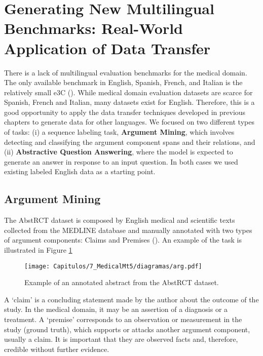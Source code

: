 \section[Generating New Multilingual Benchmarks]{Generating New Multilingual Benchmarks: Real-World Application of Data Transfer}\label{sec7:new-benchmarks}


There is a lack of multilingual evaluation benchmarks for the medical domain. The only available benchmark in English, Spanish, French, and Italian is the relatively small e3C (\cite{e3c}). While medical domain evaluation datasets are scarce for Spanish, French and Italian, many datasets exist for English. Therefore, this is a good opportunity to apply the data transfer techniques developed in previous chapters to generate data for other languages. We focused on two different types of tasks: (i) a sequence labeling task, \textbf{Argument Mining}, which involves detecting and classifying the argument component spans and their relations, and (ii) \textbf{Abstractive Question Answering}, where the model is expected to generate an answer in response to an input question. In both cases we used existing labeled English data as a starting point.

\subsection{Argument Mining}

The AbstRCT dataset is composed by English medical and scientific texts collected from the MEDLINE database and manually annotated with two types of argument components: Claims and Premises (\cite{mayer2021enhancing}). An example of the task is illustrated in Figure \ref{fig7:abstrct_example}

\begin{figure}
    \centering
    \texttt{[image: Capitulos/7\_MedicalMt5/diagramas/arg.pdf]}
    \caption{Example of an annotated abstract from the AbstRCT dataset.}
    \label{fig7:abstrct_example}
\end{figure}

A `claim'  is a concluding statement made by the author about the outcome of the study. In the medical domain, it may be an assertion of a diagnosis or a treatment. A `premise' corresponds to an observation or measurement in the study (ground truth), which supports or attacks another argument component, usually a claim. It is important that they are observed facts and, therefore, credible without further evidence.

